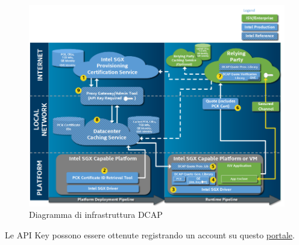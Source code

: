 \documentclass{article}
\begin{document}
\begin{figure}[H]
  \begin{center}
    \includegraphics[width=.7\textwidth]{figures/ch3/dcap-infra.png}
  \end{center}
  \caption{Diagramma di infrastruttura DCAP}\label{fig:dcap-infra}
\end{figure}

Le API Key possono essere ottenute registrando un account su questo \href{https://api.portal.trustedservices.intel.com}{portale}.
\end{document}
